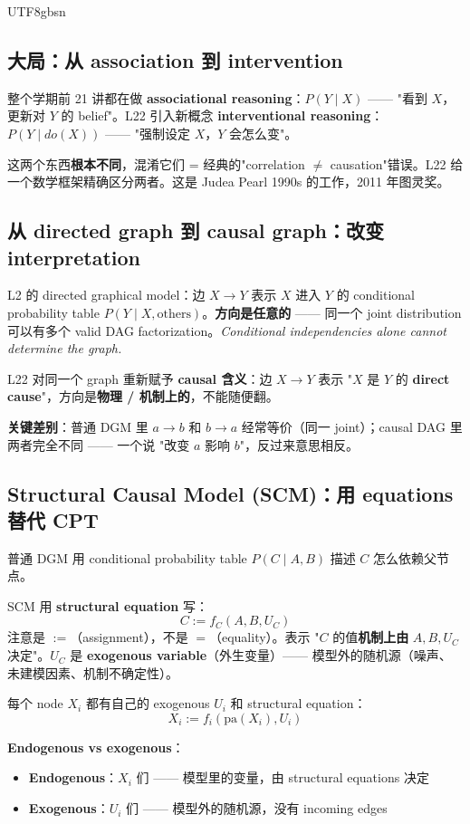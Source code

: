 \documentclass[11pt]{article}
\begin{document}
\begin{CJK}{UTF8}{gbsn}
\subsection{大局：从 association 到 intervention}

整个学期前 21 讲都在做 \textbf{associational reasoning}：$P(Y \mid X)$ —— "看到 $X$，更新对 $Y$ 的 belief"。L22 引入新概念 \textbf{interventional reasoning}：$P(Y \mid do(X))$ —— "强制设定 $X$，$Y$ 会怎么变"。

这两个东西\textbf{根本不同}，混淆它们 = 经典的"correlation $\neq$ causation"错误。L22 给一个数学框架精确区分两者。这是 Judea Pearl 1990s 的工作，2011 年图灵奖。

\subsection{从 directed graph 到 causal graph：改变 interpretation}

L2 的 directed graphical model：边 $X \to Y$ 表示 $X$ 进入 $Y$ 的 conditional probability table $P(Y \mid X, \text{others})$。\textbf{方向是任意的} —— 同一个 joint distribution 可以有多个 valid DAG factorization。\emph{Conditional independencies alone cannot determine the graph.}

L22 对同一个 graph 重新赋予 \textbf{causal 含义}：边 $X \to Y$ 表示 "$X$ 是 $Y$ 的 \textbf{direct cause}"，方向是\textbf{物理 / 机制上的}，不能随便翻。

\textbf{关键差别}：普通 DGM 里 $a \to b$ 和 $b \to a$ 经常等价（同一 joint）；causal DAG 里两者完全不同 —— 一个说 "改变 $a$ 影响 $b$"，反过来意思相反。

\subsection{Structural Causal Model (SCM)：用 equations 替代 CPT}

普通 DGM 用 conditional probability table $P(C \mid A, B)$ 描述 $C$ 怎么依赖父节点。

SCM 用 \textbf{structural equation} 写：
\[
C := f_C(A, B, U_C)
\]
注意是 $:=$（assignment），不是 $=$（equality）。表示 "$C$ 的值\textbf{机制上由} $A, B, U_C$ 决定"。$U_C$ 是 \textbf{exogenous variable}（外生变量）—— 模型外的随机源（噪声、未建模因素、机制不确定性）。

每个 node $X_i$ 都有自己的 exogenous $U_i$ 和 structural equation：
\[
X_i := f_i(\text{pa}(X_i), U_i)
\]

\textbf{Endogenous vs exogenous}：
\begin{itemize}[nosep]
  \item \textbf{Endogenous}：$X_i$ 们 —— 模型里的变量，由 structural equations 决定
  \item \textbf{Exogenous}：$U_i$ 们 —— 模型外的随机源，没有 incoming edges
\end{itemize}


\end{CJK}
\end{document}
